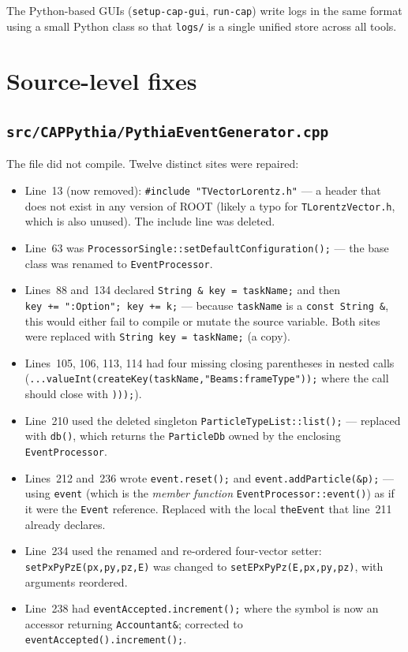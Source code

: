 \documentclass[11pt,a4paper]{article}
\begin{document}
\noindent
The Python-based GUIs (\texttt{setup-cap-gui}, \texttt{run-cap}) write logs
in the same format using a small Python class so that
\texttt{logs/} is a single unified store across all tools.

\section{Source-level fixes}

\subsection{\texttt{src/CAPPythia/PythiaEventGenerator.cpp}}

The file did not compile. Twelve distinct sites were repaired:

\begin{itemize}[leftmargin=2em,itemsep=0pt]
  \item Line~13 (now removed): \verb|#include "TVectorLorentz.h"| --- a header
        that does not exist in any version of ROOT (likely a typo for
        \texttt{TLorentzVector.h}, which is also unused). The include line
        was deleted.
  \item Line~63 was \verb|ProcessorSingle::setDefaultConfiguration();| ---
        the base class was renamed to \texttt{EventProcessor}.
  \item Lines~88 and~134 declared \texttt{String~\&~key~=~taskName;} and then
        \texttt{key~+=~":Option";~key~+=~k;} --- because \texttt{taskName} is
        a \texttt{const String\,\&}, this would either fail to compile or
        mutate the source variable. Both sites were replaced with
        \texttt{String~key~=~taskName;} (a copy).
  \item Lines~105, 106, 113, 114 had four missing closing parentheses in
        nested calls
        (\verb|...valueInt(createKey(taskName,"Beams:frameType"));| where
        the call should close with \verb|)));|).
  \item Line~210 used the deleted singleton
        \verb|ParticleTypeList::list();| --- replaced with
        \verb|db()|, which returns the
        \texttt{ParticleDb} owned by the enclosing
        \texttt{EventProcessor}.
  \item Lines~212 and~236 wrote \texttt{event.reset();} and
        \texttt{event.addParticle(\&p);} --- using \texttt{event} (which is
        the \emph{member function} \verb|EventProcessor::event()|) as if it
        were the \texttt{Event} reference. Replaced with the local
        \texttt{theEvent} that line~211 already declares.
  \item Line~234 used the renamed and re-ordered four-vector setter:
        \verb|setPxPyPzE(px,py,pz,E)| was changed to
        \verb|setEPxPyPz(E,px,py,pz)|, with arguments reordered.
  \item Line~238 had \texttt{eventAccepted.increment();} where the symbol
        is now an accessor returning \texttt{Accountant\&}; corrected to
        \texttt{eventAccepted().increment();}.
\end{itemize}
\end{document}
